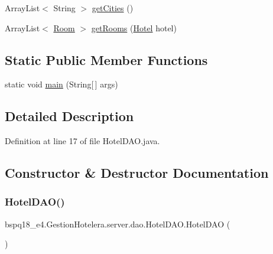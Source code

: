 \begin{DoxyCompactItemize}
\item 
Array\+List$<$ String $>$ \mbox{\hyperlink{classbspq18__e4_1_1_gestion_hotelera_1_1server_1_1dao_1_1_hotel_d_a_o_a3a9284db5b9ee5ed0ac1cb126c2150cf}{get\+Cities}} ()
\item 
Array\+List$<$ \mbox{\hyperlink{classbspq18__e4_1_1_gestion_hotelera_1_1server_1_1data_1_1_room}{Room}} $>$ \mbox{\hyperlink{classbspq18__e4_1_1_gestion_hotelera_1_1server_1_1dao_1_1_hotel_d_a_o_ad835d35e68060bbe97b32d67092878d9}{get\+Rooms}} (\mbox{\hyperlink{classbspq18__e4_1_1_gestion_hotelera_1_1server_1_1data_1_1_hotel}{Hotel}} hotel)
\end{DoxyCompactItemize}
\subsection*{Static Public Member Functions}
\begin{DoxyCompactItemize}
\item 
static void \mbox{\hyperlink{classbspq18__e4_1_1_gestion_hotelera_1_1server_1_1dao_1_1_hotel_d_a_o_af37f217638f1d25780ad01336e8404c2}{main}} (String\mbox{[}$\,$\mbox{]} args)
\end{DoxyCompactItemize}


\subsection{Detailed Description}


Definition at line 17 of file Hotel\+D\+A\+O.\+java.



\subsection{Constructor \& Destructor Documentation}
\mbox{\label{classbspq18__e4_1_1_gestion_hotelera_1_1server_1_1dao_1_1_hotel_d_a_o_a6da15770562483a6efda9e5226637bc2}} 
\subsubsection{\texorpdfstring{Hotel\+D\+A\+O()}{HotelDAO()}}
{\footnotesize\ttfamily bspq18\+\_\+e4.\+Gestion\+Hotelera.\+server.\+dao.\+Hotel\+D\+A\+O.\+Hotel\+D\+AO (\begin{DoxyParamCaption}{ }\end{DoxyParamCaption})}



